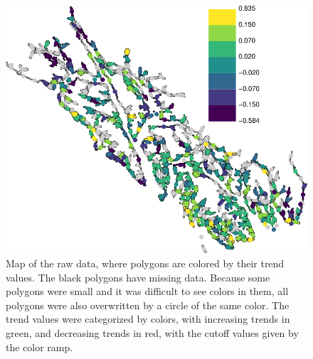\documentclass[11pt, titlepage]{article}\usepackage[]{graphicx}\usepackage[]{color}
\begin{document}



\begin{figure}[H]
  \begin{center}
  \includegraphics[width=\linewidth]{figure/Fig-MapRaw.png}
  \end{center}
  \caption{Map of the raw data, where polygons are colored by their trend values.  The black polygons have missing data.  Because some polygons were small and it was difficult to see colors in them, all polygons were also overwritten by a circle of the same color. The trend values were categorized by colors, with increasing trends in green, and decreasing trends in red, with the cutoff values given by the color ramp. \label{Fig-MapRaw}}     
\end{figure}


\end{document}
